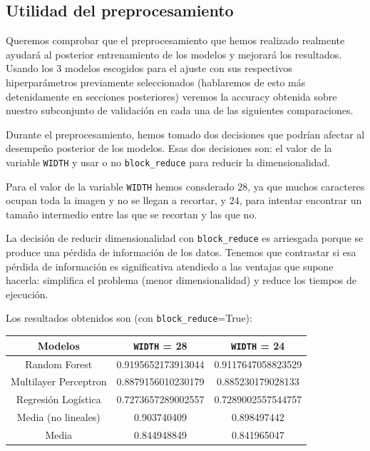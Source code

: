 \documentclass[a4]{article}
\begin{document}
\subsection{Utilidad del preprocesamiento}

Queremos comprobar que el preprocesamiento que hemos realizado
realmente ayudará al posterior entrenamiento de los modelos y mejorará
los resultados. Usando los 3 modelos escogidos para el ajuste con sus
respectivos hiperparámetros previamente seleccionados (hablaremos de
esto más detenidamente en secciones posteriores) veremos la accuracy
obtenida sobre nuestro subconjunto de validación en cada una de las
siguientes comparaciones.

Durante el preprocesamiento, hemos tomado dos decisiones que podrían
afectar al desempeño posterior de los modelos. Esas dos decisiones
son: el valor de la variable \texttt{WIDTH} y usar o no
\texttt{block\_reduce} para reducir la dimensionalidad.

Para el valor de la variable \texttt{WIDTH} hemos consderado $28$, ya
que muchos caracteres ocupan toda la imagen y no se llegan a recortar,
y $24$, para intentar encontrar un tamaño intermedio entre las que se
recortan y las que no.

La decisión de reducir dimensionalidad con \texttt{block\_reduce} es
arriesgada porque se produce una pérdida de información de los
datos. Tenemos que contrastar si esa pérdida de información es
significativa atendiedo a las ventajas que supone hacerla: simplifica
el problema (menor dimensionalidad) y reduce los tiempos de ejecución.

Los resultados obtenidos son (con \texttt{block\_reduce}=True):

\begin{center}
\begin{tabular}{|c|c|c|}
\hline
\multicolumn{1}{|c|}{Modelos}& \textbf{\texttt{WIDTH} = 28} &
\textbf{\texttt{WIDTH} = 24}  \\ \hline
  Random Forest         & 0.9195652173913044 & 0.9117647058823529 \\
  Multilayer Perceptron & 0.8879156010230179 & 0.885230179028133 \\
  Regresión Logística   & 0.7273657289002557 & 0.7289002557544757 \\
  Media (no lineales) & 0.903740409 & 0.898497442 \\
  Media & 0.844948849 & 0.841965047 \\ \hline
\end{tabular}
\end{center}
\end{document}
